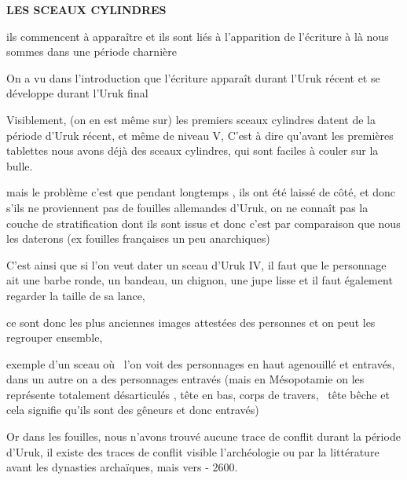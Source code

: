 \documentclass[a4paper]{article}
\begin{document}
\bigskip


\bigskip


\bigskip

{
\textbf{LES SCEAUX CYLINDRES}}


\bigskip


\bigskip

{
ils commencent à apparaître et ils sont liés à l'apparition de l'écriture à là nous sommes dans une période charnière}

{
On a vu dans l'introduction que l'écriture apparaît durant l'Uruk récent et se développe durant l'Uruk final}


\bigskip

{
Visiblement, (on en est même sur) les premiers sceaux cylindres datent de la période d'Uruk récent, et même de niveau V,
C'est à dire qu'avant les premières tablettes nous avons déjà des sceaux cylindres, qui sont faciles à couler sur la
bulle.}


\bigskip

{
mais le problème c'est que pendant longtemps , ils ont été laissé de côté, et donc s'ils ne proviennent pas de fouilles
allemandes d'Uruk, on ne connaît pas la couche de stratification dont ils sont issus et donc c'est par comparaison que
nous les daterons (ex fouilles françaises un peu anarchiques)}


\bigskip

{
C'est ainsi que si l'on veut dater un sceau d'Uruk IV, il faut que le personnage ait une barbe ronde, un bandeau, un
chignon, une jupe lisse et il faut également regarder la taille de sa lance, }

{
ce sont donc les plus anciennes images attestées des personnes et on peut les regrouper ensemble, }


\bigskip

{
exemple d'un sceau où \ l'on voit des personnages en haut agenouillé et entravés, dans un autre on a des personnages
entravés (mais en Mésopotamie on les représente totalement désarticulés , tête en bas, corps de travers, \ tête bêche
et cela signifie qu'ils sont des gêneurs et donc entravés)}


\bigskip

{
Or dans les fouilles, nous n'avons trouvé aucune trace de conflit durant la période d'Uruk, il existe des traces de
conflit visible l'archéologie ou par la littérature avant les dynasties archaïques, mais vers - 2600.}
\end{document}
